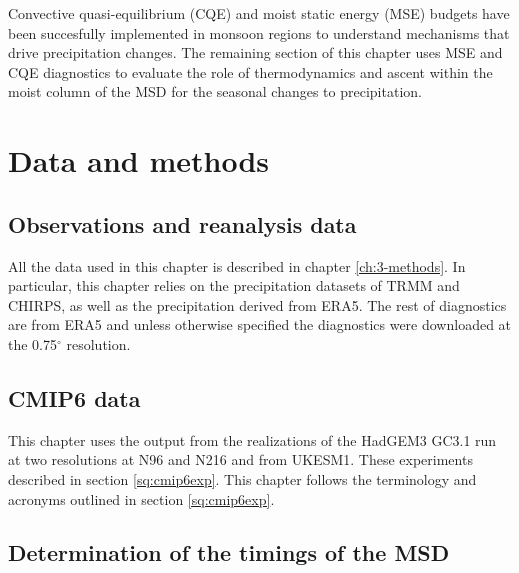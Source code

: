 




Convective quasi-equilibrium (CQE) and moist static energy (MSE) budgets have been succesfully implemented in monsoon regions to understand mechanisms that drive precipitation changes. The remaining section of this chapter uses MSE and CQE diagnostics to evaluate the role of thermodynamics and ascent within the moist column of the MSD for the seasonal changes to precipitation. 


\section{Data and methods}

\subsection{Observations and reanalysis data}

All the data used in this chapter is described in chapter \ref{ch:3-methods}. In particular, this chapter relies on the precipitation datasets of TRMM and CHIRPS, as well as the precipitation derived from ERA5. The rest of diagnostics are from ERA5 and unless otherwise specified the diagnostics were downloaded at the 0.75$^\circ$ resolution.

\subsection{CMIP6 data}

This chapter uses the output from the realizations of the HadGEM3 GC3.1 run at two resolutions at N96 and N216 and from UKESM1. These experiments described in section \ref{sq:cmip6exp}. This chapter follows the terminology and acronyms outlined in section \ref{sq:cmip6exp}. 

\subsection{Determination of the timings of the MSD}


